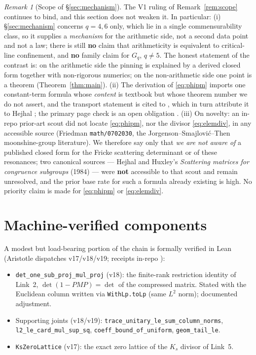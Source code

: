 \documentclass[11pt]{article}
\theoremstyle{definition}
\theoremstyle{remark}
\newtheorem{remark}[theorem]{Remark}
\begin{document}
\begin{remark}[Scope of \S\ref{sec:mechanism}]
\label{rem:mechscope}
The V1 ruling of Remark~\ref{rem:scope} continues to bind, and this
section does not weaken it. In particular: (i) \S\ref{sec:mechanism}
concerns $q = 4, 6$ only, which lie in a single commensurability class,
so it supplies a \emph{mechanism} for the arithmetic side, not a second
data point and not a law; there is still \textbf{no} claim that
arithmeticity is equivalent to critical-line confinement, and
\textbf{no} family claim for $G_q$, $q \ne 5$. The honest statement of
the contrast is: on the arithmetic side the pinning is explained by a
derived closed form together with non-rigorous numerics; on the
non-arithmetic side one point is a theorem
(Theorem~\ref{thm:main}). (ii) The derivation of \eqref{eq:phipm}
imports one constant-term formula whose \emph{content} is textbook but
whose theorem number we do not assert, and the transport statement is
cited to \cite{BFM13,Teo20}, which in turn attribute it to Hejhal
\cite{HejhalLNM1001}; the primary page check is an open obligation
\cite{LawU3}. (iii) On novelty: an in-repo prior-art scout
\cite{FrickePriorArt} did not locate \eqref{eq:phipm}, nor the divisor
\eqref{eq:elemdiv}, in any accessible source (Friedman
\texttt{math/0702030}, the Jorgenson--Smajlovi\'c--Then moonshine-group
literature). We therefore say only that \emph{we are not aware of} a
published closed form for the Fricke scattering determinant or of these
resonances; two canonical sources --- Hejhal \cite{HejhalLNM1001} and
Huxley's \emph{Scattering matrices for congruence subgroups} (1984) ---
were \textbf{not} accessible to that scout and remain unresolved, and
the prior base rate for such a formula already existing is high. No
priority claim is made for \eqref{eq:phipm} or \eqref{eq:elemdiv}.
\end{remark}

\section{Machine-verified components}
\label{sec:lean}

A modest but load-bearing portion of the chain is formally verified in
Lean (Aristotle dispatches v17/v18/v19; receipts in-repo
\cite{LeanV17,LeanV18,LeanV19}):

\begin{itemize}
\item \texttt{det\_one\_sub\_proj\_mul\_proj} (v18): the finite-rank
restriction identity of Link~2, $\det(1 - PMP) = \det$ of the
compressed matrix. Stated with the Euclidean column written via
\texttt{WithLp.toLp} (same $L^2$ norm); documented adjustment.
\item Supporting joints (v18/v19):
\texttt{trace\_unitary\_le\_sum\_column\_norms},
\texttt{l2\_le\_card\_mul\_sup\_sq},
\texttt{coeff\_bound\_of\_uniform}, \texttt{geom\_tail\_le}.
\item \texttt{KsZeroLattice} (v17): the exact zero lattice of the
$K_s$ divisor of Link~5.
\end{itemize}
\end{document}
